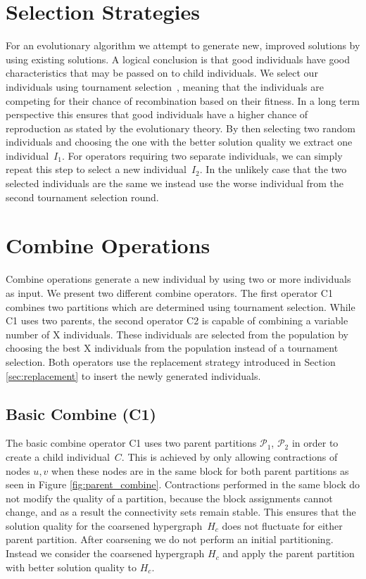 \documentclass[a4paper,12pt,titlepage, BCOR7mm,headsepline]{scrbook}
\numberwithin{equation}{section}
\begin{document}
\section{Selection Strategies}
\label{sec:selectionstrategies}
For an evolutionary algorithm we attempt to generate new, improved solutions by using existing solutions. A logical conclusion is that good individuals have good characteristics that may be passed on to child individuals.
We select our individuals using tournament selection~\cite{blickle1996comparison}, meaning that the individuals are competing for their chance of recombination based on their fitness. In a long term perspective this ensures that good individuals have a higher chance of reproduction as stated by the evolutionary theory.  By then selecting two random individuals and choosing the one with the better solution quality we extract one individual~$I_1$. For operators requiring two separate individuals, we can simply repeat this step to select a new individual~$I_2$. In the unlikely case that the two selected individuals are the same we instead use the worse individual from the second tournament selection round.
\section{Combine Operations}
\label{sec:combines}
Combine operations generate a new individual by using two or more individuals as input. We present two different combine operators. The first operator C1 combines two partitions which are determined using tournament selection. While C1 uses two parents, the second operator C2 is capable of combining a variable number of X individuals. These individuals are selected from the population by choosing the best X individuals from the population instead of a tournament selection. Both operators use the replacement strategy introduced in Section \ref{sec:replacement} to insert the newly generated individuals.
\subsection{Basic Combine (C1)}
\label{sec:basiccombine}
The basic combine operator C1 uses two parent partitions $\mathcal{P}_1$, $\mathcal{P}_2$ in order to create a child individual~$C$. This is achieved by only allowing contractions of nodes $u, v$ when these nodes are in the same block for both parent partitions as seen in Figure \ref{fig:parent_combine}. Contractions performed in the same block do not modify the quality of a partition, because the block assignments cannot change, and as a result the connectivity sets remain stable.
This ensures that the solution quality for the coarsened hypergraph~$H_c$ does not fluctuate for either parent partition.  
After coarsening we do not perform an initial partitioning. Instead we consider the coarsened hypergraph $H_c$ and apply the parent partition with better solution quality to $H_c$.
\end{document}
